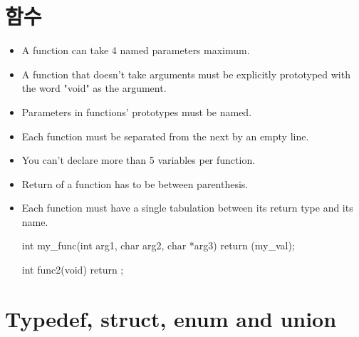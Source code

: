 \documentclass{42-ko}
\begin{document}
    \section{함수}

        \begin{itemize}

            \item A function can take 4 named parameters maximum.

            \item A function that doesn't take arguments must be
                explicitly prototyped with the word "void" as the
                argument.

            \item Parameters in functions' prototypes must be named.

            \item Each function must be separated from the next by
                an empty line.

            \item You can't declare more than 5 variables per function.

            \item Return of a function has to be between parenthesis. 

            \item Each function must have a single tabulation between its
                return type and its name.

            \begin{42ccode}
int my_func(int arg1, char arg2, char *arg3)
{
    return (my_val);
}

int func2(void)
{
    return ;
}
            \end{42ccode}

        \end{itemize}
        \newpage


    \section{Typedef, struct, enum and union}
\end{document}
